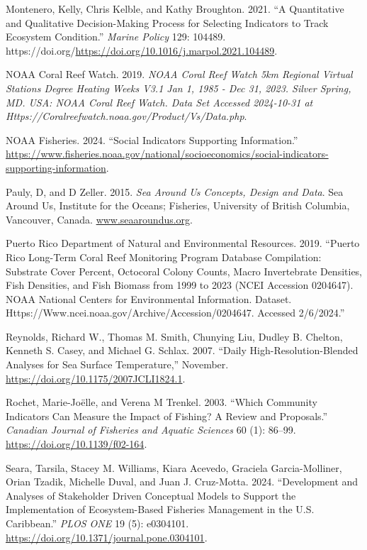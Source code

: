 \documentclass[
  letterpaper,
  oneside,
  open=any]{scrbook}
\newlength{\cslhangindent}
\newenvironment{CSLReferences}[2] %
 {\begin{list}{}{%
  \setlength{\itemindent}{0pt}
  \setlength{\leftmargin}{0pt}
  \setlength{\parsep}{0pt}
  \ifodd #1
   \setlength{\leftmargin}{\cslhangindent}
   \setlength{\itemindent}{-1\cslhangindent}
  \fi
  \setlength{\itemsep}{#2\baselineskip}}}
 {\end{list}}
\begin{document}
\begin{CSLReferences}{1}{0}
Montenero, Kelly, Chris Kelble, and Kathy Broughton. 2021. {``A
Quantitative and Qualitative Decision-Making Process for Selecting
Indicators to Track Ecosystem Condition.''} \emph{Marine Policy} 129:
104489.
https://doi.org/\url{https://doi.org/10.1016/j.marpol.2021.104489}.

NOAA Coral Reef Watch. 2019. \emph{NOAA Coral Reef Watch 5km Regional
Virtual Stations Degree Heating Weeks V3.1 Jan 1, 1985 - Dec 31, 2023.
Silver Spring, MD. USA: NOAA Coral Reef Watch. Data Set Accessed
2024-10-31 at Https://Coralreefwatch.noaa.gov/Product/Vs/Data.php}.

NOAA Fisheries. 2024. {``Social Indicators Supporting Information.''}
\url{https://www.fisheries.noaa.gov/national/socioeconomics/social-indicators-supporting-information}.

Pauly, D, and D Zeller. 2015. \emph{Sea Around Us Concepts, Design and
Data}. Sea Around Us, Institute for the Oceans; Fisheries, University of
British Columbia, Vancouver, Canada.
\href{https://www.seaaroundus.org}{www.seaaroundus.org}.

Puerto Rico Department of Natural and Environmental Resources. 2019.
{``Puerto Rico Long-Term Coral Reef Monitoring Program Database
Compilation: Substrate Cover Percent, Octocoral Colony Counts, Macro
Invertebrate Densities, Fish Densities, and Fish Biomass from 1999 to
2023 (NCEI Accession 0204647). NOAA National Centers for Environmental
Information. Dataset.
Https://Www.ncei.noaa.gov/Archive/Accession/0204647. Accessed
2/6/2024.''}

Reynolds, Richard W., Thomas M. Smith, Chunying Liu, Dudley B. Chelton,
Kenneth S. Casey, and Michael G. Schlax. 2007. {``Daily
High-Resolution-Blended Analyses for Sea Surface Temperature,''}
November. \url{https://doi.org/10.1175/2007JCLI1824.1}.

Rochet, Marie-Joëlle, and Verena M Trenkel. 2003. {``Which Community
Indicators Can Measure the Impact of Fishing? A Review and Proposals.''}
\emph{Canadian Journal of Fisheries and Aquatic Sciences} 60 (1):
86--99. \url{https://doi.org/10.1139/f02-164}.

Seara, Tarsila, Stacey M. Williams, Kiara Acevedo, Graciela
Garcia-Molliner, Orian Tzadik, Michelle Duval, and Juan J. Cruz-Motta.
2024. {``Development and Analyses of Stakeholder Driven Conceptual
Models to Support the Implementation of Ecosystem-Based Fisheries
Management in the U.S. Caribbean.''} \emph{PLOS ONE} 19 (5): e0304101.
\url{https://doi.org/10.1371/journal.pone.0304101}.


\end{CSLReferences}
\end{document}
